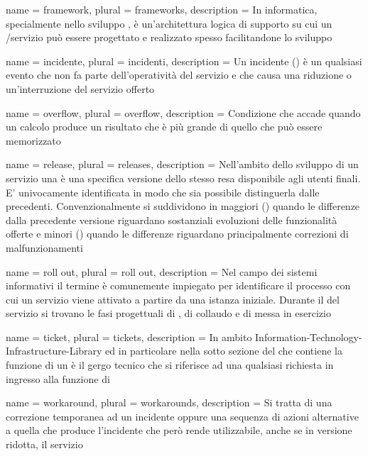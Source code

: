 {
	name		= {framework},
	plural		= {frameworks},
	description = {In informatica, specialmente nello sviluppo , è un'architettura logica di supporto su cui un /servizio può essere progettato e realizzato spesso facilitandone lo sviluppo}
}

{
	name		= {incidente},
	plural		= {incidenti},
	description	= {Un incidente () è un qualsiasi evento che non fa parte dell'operatività  del servizio e che causa una riduzione o un'interruzione del servizio offerto}
}

{
	name		= {overflow},
	plural		= {overflow},
	description = {Condizione che accade quando un calcolo produce un risultato che è più grande di quello che può essere memorizzato}
}

{
	name		= {release},
	plural		= {releases},
	description = {Nell'ambito dello sviluppo di un servizio una  è una specifica versione dello stesso resa disponibile agli utenti finali. E' univocamente identificata in modo che sia possibile distinguerla dalle precedenti. Convenzionalmente si suddividono in  maggiori () quando le differenze dalla precedente versione riguardano sostanziali evoluzioni delle funzionalità offerte e  minori () quando le differenze riguardano principalmente correzioni di malfunzionamenti}
}

{
	name		= {roll out},
	plural		= {roll out},
	description = {Nel campo dei sistemi informativi il termine  è comunemente impiegato per identificare il processo con cui un servizio viene attivato a partire da una istanza iniziale. Durante il  del servizio si trovano le fasi progettuali di , di collaudo e di messa in esercizio}
}

{
	name		= {ticket},
	plural		= {tickets},
	description = {In ambito \ac{Information-Technology-Infrastructure-Library} ed in particolare nella sotto sezione del  che contiene la funzione di  un  è il gergo tecnico che si riferisce ad una qualsiasi richiesta in ingresso alla funzione di }
}

{
	name		= {workaround},
	plural		= {workarounds},
	description	= {Si tratta di una correzione temporanea ad un incidente oppure una sequenza di azioni alternative a quella che produce l'incidente che però rende utilizzabile, anche se in versione ridotta, il servizio}
}